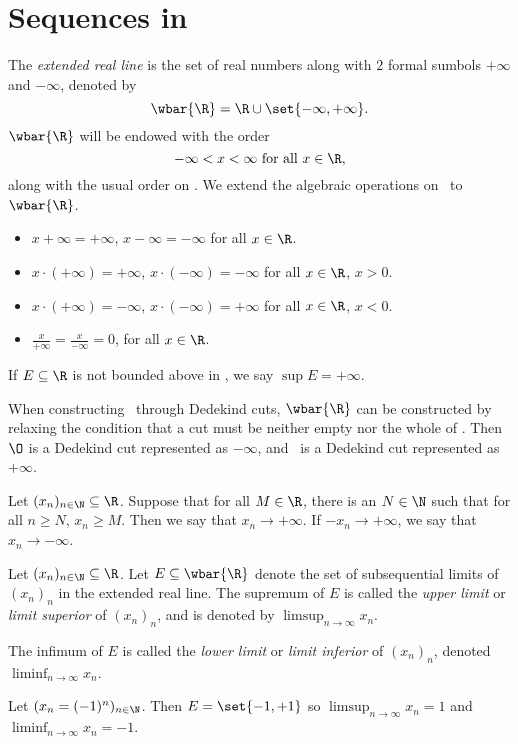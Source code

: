 \section{Sequences in \R} \label{sec:sequences:R}
\begin{definition} \label{def:sequences:R:extended}
    The \emph{extended real line} is the set of real numbers along with $2$
    formal sumbols $+\infty$ and $-\infty$, denoted by \[
        \wbar{\R} = \R \cup \set{-\infty, +\infty}.
    \]
    $\wbar{\R}$ will be endowed with the order \[
        -\infty < x < \infty \text{ for all } x \in \R,
    \] along with the usual order on \R.
    We extend the algebraic operations on \R\ to $\wbar{\R}$.
    \begin{itemize}
        \item $x + \infty = +\infty$, $x - \infty = -\infty$ for all
            $x \in \R$.
        \item $x \cdot (+\infty) = +\infty$, $x \cdot (-\infty) = -\infty$
            for all $x \in \R$, $x > 0$.
        \item $x \cdot (+\infty) = -\infty$, $x \cdot (-\infty) = +\infty$
            for all $x \in \R$, $x < 0$.
        \item $\frac{x}{+\infty} = \frac{x}{-\infty} = 0$, for all
            $x \in \R$.
    \end{itemize}
    If $E \subseteq \R$ is not bounded above in \R,
    we say $\sup E = +\infty$.
\end{definition}
When constructing \R\ through Dedekind cuts, $\wbar{\R}$ can be constructed
by relaxing the condition that a cut must be neither empty nor the whole of
\Q.
Then $\O$ is a Dedekind cut represented as $-\infty$,
and \Q\ is a Dedekind cut represented as $+\infty$.

\begin{definition}
    Let $(x_n)_{n \in \N} \subseteq \R$.
    Suppose that for all $M \in \R$, there is an $N \in \N$ such that for
    all $n \ge N$, $x_n \ge M$.
    Then we say that $x_n \to +\infty$.
    If $-x_n \to +\infty$, we say that $x_n \to -\infty$.
\end{definition}

\begin{definition*}
    Let $(x_n)_{n \in \N} \subseteq \R$.
    Let $E \subseteq \wbar{\R}$ denote the set of subsequential limits of
    $(x_n)_n$ in the extended real line.
    The supremum of $E$ is called the \emph{upper limit} or \emph{limit
    superior} of $(x_n)_n$, and is denoted by $\limsup_{n \to \infty} x_n$.

    The infimum of $E$ is called the \emph{lower limit} or \emph{limit
    inferior} of $(x_n)_n$, denoted $\liminf_{n \to \infty} x_n$.
\end{definition*}
\begin{example}
    Let $(x_n = (-1)^n)_{n \in \N}$.
    Then $E = \set{-1, +1}$ so $\limsup_{n \to \infty} x_n = 1$ and
    $\liminf_{n \to \infty} x_n = -1$.
\end{example}

